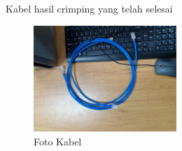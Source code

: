 Kabel hasil crimping yang telah selesai 

\begin{figure}[H]
    \centering
    \includegraphics[width=0.48\textwidth]{P1/img/Crimping 4.jpeg}
    \caption{Foto Kabel}
    \label{fig:crimping4_lampiran}
\end{figure}


